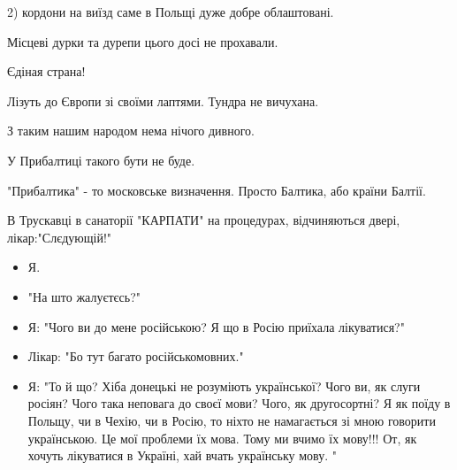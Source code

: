 \begin{itemize}
2) кордони на виїзд саме в Польщі дуже добре облаштовані.

Місцеві дурки та дурепи цього досі не прохавали.

 
Єдіная страна!

 

Лізуть до Європи зі своїми лаптями. Тундра не вичухана.

З таким нашим народом нема нічого дивного.

У Прибалтиці такого бути не буде.

\begin{itemize}
 
"Прибалтика" - то московське визначення. Просто Балтика, або країни Балтії.
\end{itemize}

 

В Трускавці в санаторії "КАРПАТИ" на процедурах, відчиняються двері, лікар:"Слєдующій!"

\begin{itemize}
\item Я.
\item "На што жалуєтєсь?"
\item Я: "Чого ви до мене російською?
Я що в Росію приїхала лікуватися?"
\item Лікар: "Бо тут багато російськомовних."
\item Я: "То й що? Хіба донецькі не розуміють української? Чого ви, як слуги росіян? Чого така неповага до своєї мови? Чого, як другосортні?
Я як поїду в Польщу, чи в Чехію, чи в Росію, то ніхто не намагається зі мною
говорити українською. Це мої проблеми їх мова. Тому ми вчимо їх мову!!!
От, як хочуть лікуватися в Україні, хай вчать українську мову. "
\end{itemize}


\end{itemize}
